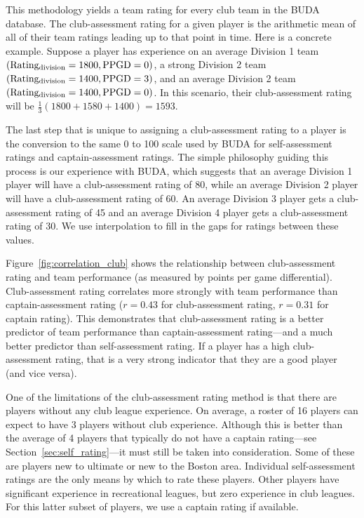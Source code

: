 This methodology yields a team rating for every club team in the BUDA database. The club-assessment rating for a given player is the arithmetic mean of all of their team ratings leading up to that point in time. Here is a concrete example. Suppose a player has experience on an average Division 1 team $({\rm Rating_{division} = 1800}, {\rm PPGD} = 0)$, a strong Division 2 team $({\rm Rating_{division} = 1400}, {\rm PPGD} = 3)$, and an average Division 2 team $({\rm Rating_{division} = 1400}, {\rm PPGD} = 0)$. In this scenario, their club-assessment rating will be $\frac{1}{3}(1800 + 1580 + 1400) = 1593$.

The last step that is unique to assigning a club-assessment rating to a player is the conversion to the same 0 to 100 scale used by BUDA for self-assessment ratings and captain-assessment ratings. The simple philosophy guiding this process is our experience with BUDA, which suggests that an average Division 1 player will have a club-assessment rating of 80, while an average Division 2 player will have a club-assessment rating of 60. An average Division 3 player gets a club-assessment rating of 45 and an average Division 4 player gets a club-assessment rating of 30. We use interpolation to fill in the gaps for ratings between these values.

Figure~\ref{fig:correlation_club} shows the relationship between club-assessment rating and team performance (as measured by points per game differential). Club-assessment rating correlates more strongly with team performance than captain-assessment rating ($r = 0.43$ for club-assessment rating, $r = 0.31$ for captain rating). This demonstrates that club-assessment rating is a better predictor of team performance than captain-assessment rating---and a much better predictor than self-assessment rating. If a player has a high club-assessment rating, that is a very strong indicator that they are a good player (and vice versa).

One of the limitations of the club-assessment rating method is that there are players without any club league experience.  On average, a roster of 16 players can expect to have 3 players without club experience. Although this is better than the average of 4 players that typically do not have a captain rating---see Section~\ref{sec:self_rating}---it must still be taken into consideration. Some of these are players new to ultimate or new to the Boston area. Individual self-assessment ratings are the only means by which to rate these players. Other players have significant experience in recreational leagues, but zero experience in club leagues. For this latter subset of players, we use a captain rating if available. 

